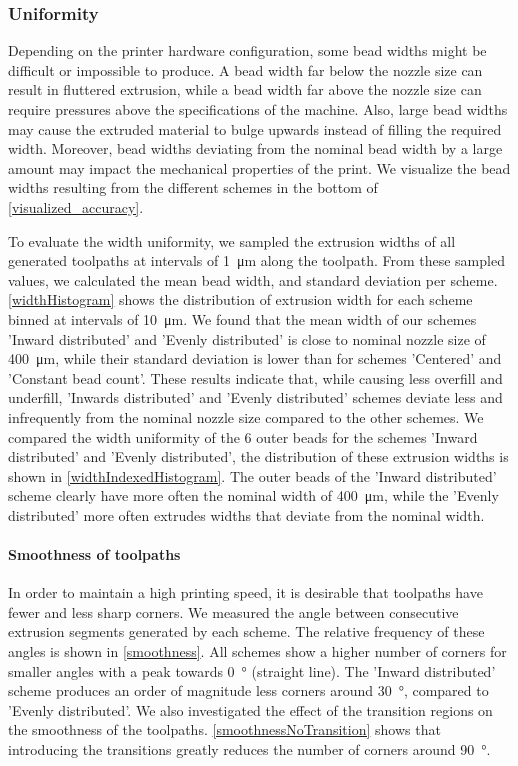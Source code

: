 








\subsubsection{Uniformity}
Depending on the printer hardware configuration, some bead widths might be difficult or impossible to produce.
A bead width far below the nozzle size can result in fluttered extrusion, while a bead width far above the nozzle size can require pressures above the specifications of the machine. 
Also, large bead widths may cause the extruded material to bulge upwards instead of filling the required width.
Moreover, bead widths deviating from the nominal bead width by a large amount may impact the mechanical properties of the print.
We visualize the bead widths resulting from the different schemes in the bottom of \cref{visualized_accuracy}.

To evaluate the width uniformity, we sampled the extrusion widths of all generated toolpaths 
at intervals of \SI{1}{\micro\meter} along the toolpath.
From these sampled values, we calculated the mean bead width, and standard deviation per scheme.
\cref{widthHistogram} shows the distribution of extrusion width for each scheme binned at intervals of \SI{10}{\micro\meter}.
We found that the mean width of our schemes 'Inward distributed' and 'Evenly distributed' is close to nominal nozzle size of \SI{400}{\micro\meter}, while their standard deviation is lower than for schemes 'Centered' and 'Constant bead count'. 
These results indicate that, while causing less overfill and underfill, 'Inwards distributed' and 'Evenly distributed' schemes deviate less and infrequently from the nominal nozzle size compared to the other schemes.
We compared the width uniformity of the 6 outer beads for the schemes 'Inward distributed' and 'Evenly distributed', the distribution of these extrusion widths is shown in \cref{widthIndexedHistogram}. 
The outer beads of the 'Inward distributed' scheme clearly have more often the nominal width of \SI{400}{\micro\meter}, while the 'Evenly distributed' more often extrudes widths that deviate from the nominal width.

\paragraph{Smoothness of toolpaths}
In order to maintain a high printing speed, it is desirable that toolpaths have fewer and less sharp corners. 
We measured the angle between consecutive extrusion segments generated by each scheme.
The relative frequency of these angles is shown in \cref{smoothness}.
All schemes show a higher number of corners for smaller angles with a peak towards \SI{0}{\degree} (straight line).
The 'Inward distributed' scheme produces an order of magnitude less corners around \SI{30}{\degree}, compared to 'Evenly distributed'. 
We also investigated the effect of the transition regions on the smoothness of the toolpaths. 
\cref{smoothnessNoTransition} shows that introducing the transitions greatly reduces the number of corners around \SI{90}{\degree}. 

